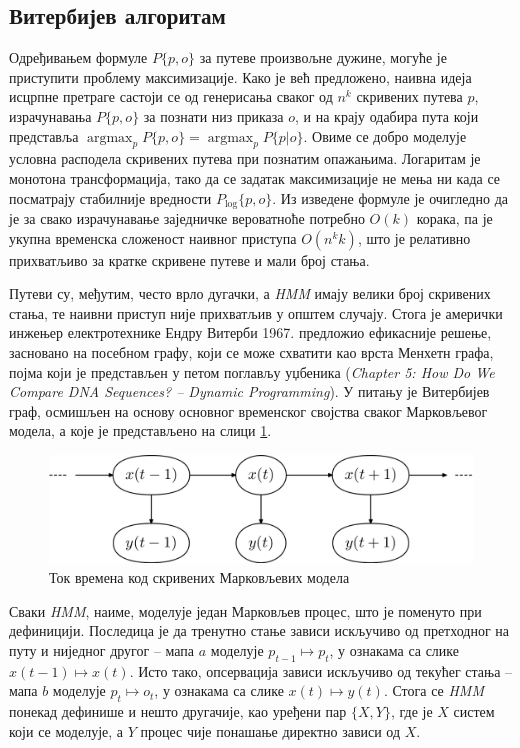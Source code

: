 \documentclass[12pt,oneside]{memoir}
\begin{document}
\begin{CJK}{UTF8}{ipxm}
\section{Витербијев алгоритам}
Одређивањем формуле $P\{p, o\}$ за путеве произвољне дужине, могуће је приступити проблему максимизације. Како је већ предложено, наивна идеја исцрпне претраге састоји се од генерисања сваког од $n^k$ скривених путева $p$, израчунавања $P\{p, o\}$ за познати низ приказа $o$, и на крају одабира пута који представља $\operatorname*{argmax}_p P\{p, o\} = \operatorname*{argmax}_p P\{p | o\}$. Овиме се добро моделује условна расподела скривених путева при познатим опажањима. Логаритам је монотона трансформација, тако да се задатак максимизације не мења ни када се посматрају стабилније вредности $P_{\log}\{p, o\}$. Из изведене формуле је очигледно да је за свако израчунавање заједничке вероватноће потребно $O(k)$ корака, па је укупна временска сложеност наивног приступа $O(n^k k)$, што је релативно прихватљиво за кратке скривене путеве и мали број стања.

Путеви су, међутим, често врло дугачки, а \textit{HMM} имају велики број скривених стања, те наивни приступ није прихватљив у општем случају. Стога је амерички инжењер електротехнике Ендру Витерби 1967. предложио ефикасније решење\cite{viterbi1967}, засновано на посебном графу, који се може схватити као врста Менхетн графа, појма који је представљен у петом поглављу уџбеника (\textit{Chapter 5: How Do We Compare DNA Sequences? -- Dynamic Programming}). У питању је Витербијев граф, осмишљен на основу основног временског својства сваког Марковљевог модела, а које је представљено на слици \ref{fig:vreme}.

\begin{figure}[H]
  \centering
  \includegraphics[width=.85\textwidth]{vreme.png}
  \caption{Ток времена код скривених Марковљевих модела\cite{vreme}}
  \label{fig:vreme}
\end{figure}

Сваки \textit{HMM}, наиме, моделује један Марковљев процес, што је поменуто при дефиницији. Последица је да тренутно стање зависи искључиво од претходног на путу и ниједног другог -- мапа $a$ моделује $p_{t-1} \mapsto p_t$, у ознакама са слике $x(t-1) \mapsto x(t)$. Исто тако, опсервација зависи искључиво од текућег стања -- мапа  $b$ моделује $p_t \mapsto o_t$, у ознакама са слике $x(t) \mapsto y(t)$. Стога се \textit{HMM} понекад дефинише и нешто другачије, као уређени пар $\{X, Y\}$, где је $X$ систем који се моделује, а $Y$ процес чије понашање директно зависи од $X$.


\end{CJK}
\end{document}
